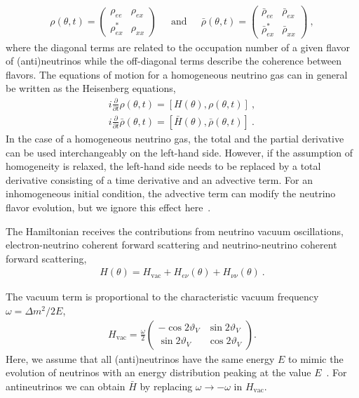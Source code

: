 \documentclass[aps, prd, 10pt, twocolumn, superscriptaddress, noshowpacs, preprintnumbers, longbibliography, groupedaddress, footinbib, bibnotes]{revtex4-1}
\newcommand{\den}{\rho(\theta,t)}
\newcommand{\denbar}{\bar{\rho}(\theta,t)}
\begin{document}
\begin{eqnarray}
\den = 
\begin{pmatrix}
\rho_{ee} & \rho_{ex}\\
\rho_{ex}^{*} & \rho_{xx} 
\end{pmatrix}\ \quad\ \mathrm{and}\ \quad\ 
\denbar =
\begin{pmatrix}
\bar{\rho}_{ee} & \bar{\rho}_{ex}\\
\bar{\rho}_{ex}^{*} & \bar{\rho}_{xx} 
\end{pmatrix}\ ,
\end{eqnarray}
where the diagonal terms are related to the occupation number of a given flavor of (anti)neutrinos while the off-diagonal terms describe the coherence between flavors. The equations of motion for a homogeneous neutrino gas can in general be written as the Heisenberg equations,
\begin{eqnarray}
i\frac{\partial}{\partial t}  \den
= [H(\theta),\den]\ ,
\label{eom1} \\
i\frac{\partial}{\partial t}  \denbar
= [\bar{H}(\theta),\denbar]\ .
\label{eom2}
\end{eqnarray}
In the case of a homogeneous neutrino gas, the total and the partial derivative can be used interchangeably on the left-hand side. However, if the assumption of homogeneity is relaxed, the left-hand side needs to be replaced by a total derivative consisting of a time derivative and an advective term. For an inhomogeneous initial condition, the advective term can modify the neutrino flavor evolution, but we ignore this effect here~\cite{Shalgar:2019qwg}.

The Hamiltonian receives the contributions from neutrino vacuum oscillations, electron-neutrino coherent forward scattering and neutrino-neutrino coherent forward scattering,
\begin{eqnarray}
\label{eq:H}
H(\theta) = H_{\mathrm{vac}} +  H_{e\nu}(\theta)+H_{\nu\nu}(\theta) \ .
\end{eqnarray}

The vacuum term is proportional to the characteristic vacuum frequency $\omega = \Delta m^2 / 2 E$,
\begin{eqnarray}
	H_{\mathrm{vac}} = \frac{\omega}{2} \left(\begin{matrix}-\cos 2\vartheta_V & \sin 2\vartheta_V\\ \sin 2\vartheta_V & \cos 2\vartheta_V\end{matrix}\right).
\end{eqnarray}
Here, we assume that all (anti)neutrinos have the same energy $E$ to mimic the evolution of neutrinos with an energy distribution peaking at the value $E$~\cite{Shalgar:2020xns}. For antineutrinos we can obtain $ \bar{H}$ by replacing $ \omega \rightarrow -\omega$ in $H_{\mathrm{vac}}$. 
\end{document}
